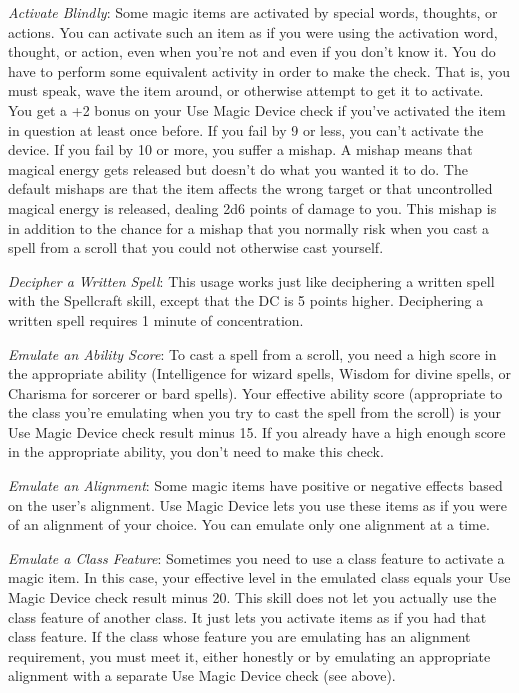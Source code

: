 \textit{Activate Blindly}: Some magic items are activated by special words, thoughts, or actions. You can activate such an item as if you were using the activation word, thought, or action, even when you're not and even if you don't know it. You do have to perform some equivalent activity in order to make the check. That is, you must speak, wave the item around, or otherwise attempt to get it to activate. You get a +2 bonus on your Use Magic Device check if you've activated the item in question at least once before. If you fail by 9 or less, you can't activate the device. If you fail by 10 or more, you suffer a mishap. A mishap means that magical energy gets released but doesn't do what you wanted it to do. The default mishaps are that the item affects the wrong target or that uncontrolled magical energy is released, dealing 2d6 points of damage to you. This mishap is in addition to the chance for a mishap that you normally risk when you cast a spell from a scroll that you could not otherwise cast yourself.
				
\textit{Decipher a Written Spell}: This usage works just like deciphering a written spell with the Spellcraft skill, except that the DC is 5 points higher. Deciphering a written spell requires 1 minute of concentration.
				
\textit{Emulate an Ability Score}: To cast a spell from a scroll, you need a high score in the appropriate ability (Intelligence for wizard spells, Wisdom for divine spells, or Charisma for sorcerer or bard spells). Your effective ability score (appropriate to the class you're emulating when you try to cast the spell from the scroll) is your Use Magic Device check result minus 15. If you already have a high enough score in the appropriate ability, you don't need to make this check.
				
\textit{Emulate an Alignment}: Some magic items have positive or negative effects based on the user's alignment. Use Magic Device lets you use these items as if you were of an alignment of your choice. You can emulate only one alignment at a time.
				
\textit{Emulate a Class Feature}: Sometimes you need to use a class feature to activate a magic item. In this case, your effective level in the emulated class equals your Use Magic Device check result minus 20. This skill does not let you actually use the class feature of another class. It just lets you activate items as if you had that class feature. If the class whose feature you are emulating has an alignment requirement, you must meet it, either honestly or by emulating an appropriate alignment with a separate Use Magic Device check (see above).
				
